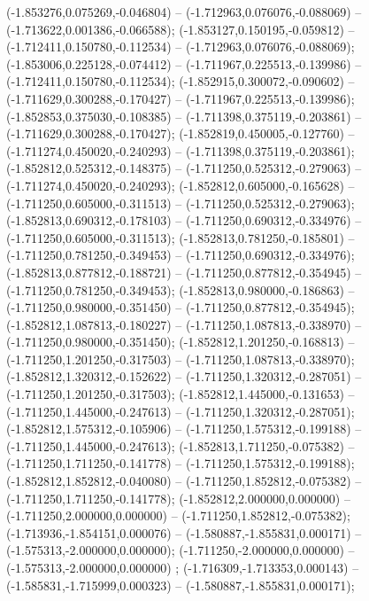  (-1.853276,0.075269,-0.046804) -- (-1.712963,0.076076,-0.088069) -- (-1.713622,0.001386,-0.066588);
 (-1.853127,0.150195,-0.059812) -- (-1.712411,0.150780,-0.112534) -- (-1.712963,0.076076,-0.088069);
 (-1.853006,0.225128,-0.074412) -- (-1.711967,0.225513,-0.139986) -- (-1.712411,0.150780,-0.112534);
 (-1.852915,0.300072,-0.090602) -- (-1.711629,0.300288,-0.170427) -- (-1.711967,0.225513,-0.139986);
 (-1.852853,0.375030,-0.108385) -- (-1.711398,0.375119,-0.203861) -- (-1.711629,0.300288,-0.170427);
 (-1.852819,0.450005,-0.127760) -- (-1.711274,0.450020,-0.240293) -- (-1.711398,0.375119,-0.203861);
 (-1.852812,0.525312,-0.148375) -- (-1.711250,0.525312,-0.279063) -- (-1.711274,0.450020,-0.240293);
 (-1.852812,0.605000,-0.165628) -- (-1.711250,0.605000,-0.311513) -- (-1.711250,0.525312,-0.279063);
 (-1.852813,0.690312,-0.178103) -- (-1.711250,0.690312,-0.334976) -- (-1.711250,0.605000,-0.311513);
 (-1.852813,0.781250,-0.185801) -- (-1.711250,0.781250,-0.349453) -- (-1.711250,0.690312,-0.334976);
 (-1.852813,0.877812,-0.188721) -- (-1.711250,0.877812,-0.354945) -- (-1.711250,0.781250,-0.349453);
 (-1.852813,0.980000,-0.186863) -- (-1.711250,0.980000,-0.351450) -- (-1.711250,0.877812,-0.354945);
 (-1.852812,1.087813,-0.180227) -- (-1.711250,1.087813,-0.338970) -- (-1.711250,0.980000,-0.351450);
 (-1.852812,1.201250,-0.168813) -- (-1.711250,1.201250,-0.317503) -- (-1.711250,1.087813,-0.338970);
 (-1.852812,1.320312,-0.152622) -- (-1.711250,1.320312,-0.287051) -- (-1.711250,1.201250,-0.317503);
 (-1.852812,1.445000,-0.131653) -- (-1.711250,1.445000,-0.247613) -- (-1.711250,1.320312,-0.287051);
 (-1.852812,1.575312,-0.105906) -- (-1.711250,1.575312,-0.199188) -- (-1.711250,1.445000,-0.247613);
 (-1.852813,1.711250,-0.075382) -- (-1.711250,1.711250,-0.141778) -- (-1.711250,1.575312,-0.199188);
 (-1.852812,1.852812,-0.040080) -- (-1.711250,1.852812,-0.075382) -- (-1.711250,1.711250,-0.141778);
 (-1.852812,2.000000,0.000000) -- (-1.711250,2.000000,0.000000) -- (-1.711250,1.852812,-0.075382);
 (-1.713936,-1.854151,0.000076) -- (-1.580887,-1.855831,0.000171) -- (-1.575313,-2.000000,0.000000);
 (-1.711250,-2.000000,0.000000) -- (-1.575313,-2.000000,0.000000) ;
 (-1.716309,-1.713353,0.000143) -- (-1.585831,-1.715999,0.000323) -- (-1.580887,-1.855831,0.000171);
